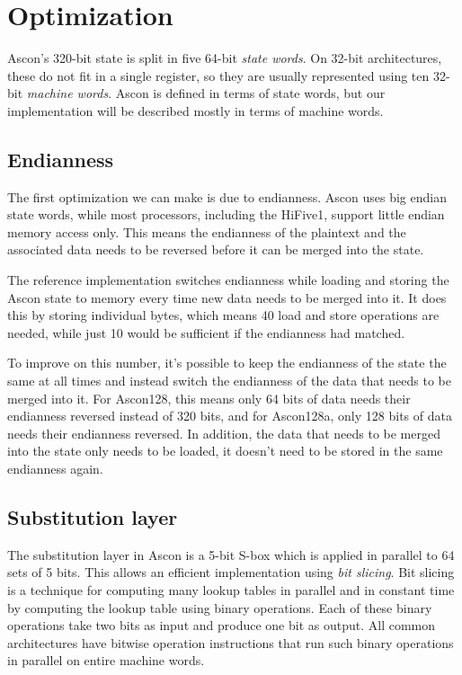\section{Optimization}


Ascon's 320-bit state is split in five 64-bit \emph{state words}. On 32-bit
architectures, these do not fit in a single register, so they are usually
represented using ten 32-bit \emph{machine words}. Ascon is defined in terms of
state words, but our implementation will be described mostly in terms of machine
words.

\subsection{Endianness}

The first optimization we can make is due to endianness. Ascon uses big endian
state words, while most processors, including the HiFive1, support little endian
memory access only. This means the endianness of the plaintext and the
associated data needs to be reversed before it can be merged into the state.

The reference implementation switches endianness while loading and storing the
Ascon state to memory every time new data needs to be merged into it. It does
this by storing individual bytes, which means 40 load and store operations are
needed, while just 10 would be sufficient if the endianness had matched.

To improve on this number, it's possible to keep the endianness of the state the
same at all times and instead switch the endianness of the data that needs to be
merged into it. For Ascon128, this means only 64 bits of data needs their
endianness reversed instead of 320 bits, and for Ascon128a, only 128 bits of
data needs their endianness reversed. In addition, the data that needs to be
merged into the state only needs to be loaded, it doesn't need to be stored in
the same endianness again.

\subsection{Substitution layer}

The substitution layer in Ascon is a 5-bit S-box which is applied in parallel to
64 sets of 5 bits. This allows an efficient implementation using
\emph{bit slicing}. Bit slicing is a technique for computing many lookup tables
in parallel and in constant time by computing the lookup table using binary
operations. Each of these binary operations take two bits as input and produce
one bit as output. All common architectures have bitwise operation instructions
that run such binary operations in parallel on entire machine words.

